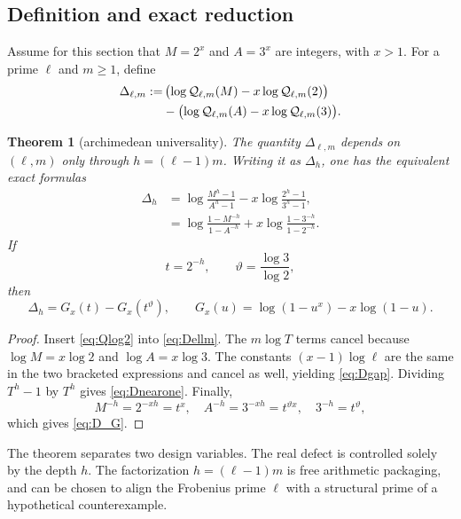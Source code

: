 \documentclass[11pt]{article}
\numberwithin{equation}{section}
\newtheorem{theorem}{Theorem}[section]
\theoremstyle{definition}
\theoremstyle{remark}
\begin{document}
\subsection{Definition and exact reduction}

Assume for this section that $M=2^x$ and $A=3^x$ are integers, with $x>1$.  For a prime $\ell$ and $m\ge1$, define
\begin{align}
  \Delta_{\ell,m}
  :=&\,\bigl(\log\mathcal Q_{\ell,m}(M)-x\log\mathcal Q_{\ell,m}(2)\bigr)\notag\\
  &-\bigl(\log\mathcal Q_{\ell,m}(A)-x\log\mathcal Q_{\ell,m}(3)\bigr).
  \label{eq:Dellm}
\end{align}

\begin{theorem}[archimedean universality]\label{thm:universality}
The quantity $\Delta_{\ell,m}$ depends on $(\ell,m)$ only through $h=(\ell-1)m$.  Writing it as $\Delta_h$, one has the equivalent exact formulas
\begin{align}
  \Delta_h
  &=\log\frac{M^h-1}{A^h-1}
    -x\log\frac{2^h-1}{3^h-1},\label{eq:Dgap}\\
  &=\log\frac{1-M^{-h}}{1-A^{-h}}
    +x\log\frac{1-3^{-h}}{1-2^{-h}}.\label{eq:Dnearone}
\end{align}
If
\begin{equation}\label{eq:t-theta}
  t=2^{-h},\qquad \vartheta=\frac{\log3}{\log2},
\end{equation}
then
\begin{equation}\label{eq:D_G}
  \Delta_h=G_x(t)-G_x(t^\vartheta),
  \qquad
  G_x(u)=\log(1-u^x)-x\log(1-u).
\end{equation}
\end{theorem}

\begin{proof}
Insert \eqref{eq:Qlog2} into \eqref{eq:Dellm}.  The $m\log T$ terms cancel because $\log M=x\log2$ and $\log A=x\log3$.  The constants $(x-1)\log\ell$ are the same in the two bracketed expressions and cancel as well, yielding \eqref{eq:Dgap}.  Dividing $T^h-1$ by $T^h$ gives \eqref{eq:Dnearone}.  Finally,
\[
  M^{-h}=2^{-xh}=t^x,
  \quad A^{-h}=3^{-xh}=t^{\vartheta x},
  \quad 3^{-h}=t^\vartheta,
\]
which gives \eqref{eq:D_G}.
\end{proof}

The theorem separates two design variables.  The real defect is controlled solely by the depth $h$.  The factorization $h=(\ell-1)m$ is free arithmetic packaging, and can be chosen to align the Frobenius prime $\ell$ with a structural prime of a hypothetical counterexample.
\end{document}
